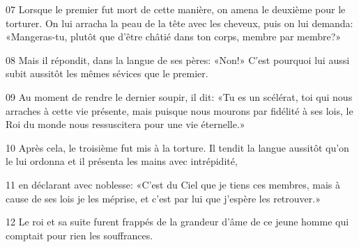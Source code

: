 07 Lorsque le premier fut mort de cette manière, on amena le deuxième pour le torturer. On lui arracha la peau de la tête avec les cheveux, puis on lui demanda: «Mangeras-tu, plutôt que d’être châtié dans ton corps, membre par membre?»

08 Mais il répondit, dans la langue de ses pères: «Non!» C’est pourquoi lui aussi subit aussitôt les mêmes sévices que le premier.

09 Au moment de rendre le dernier soupir, il dit: «Tu es un scélérat, toi qui nous arraches à cette vie présente, mais puisque nous mourons par fidélité à ses lois, le Roi du monde nous ressuscitera pour une vie éternelle.»

10 Après cela, le troisième fut mis à la torture. Il tendit la langue aussitôt qu’on le lui ordonna et il présenta les mains avec intrépidité,

11 en déclarant avec noblesse: «C’est du Ciel que je tiens ces membres, mais à cause de ses lois je les méprise, et c’est par lui que j’espère les retrouver.»

12 Le roi et sa suite furent frappés de la grandeur d’âme de ce jeune homme qui comptait pour rien les souffrances.
